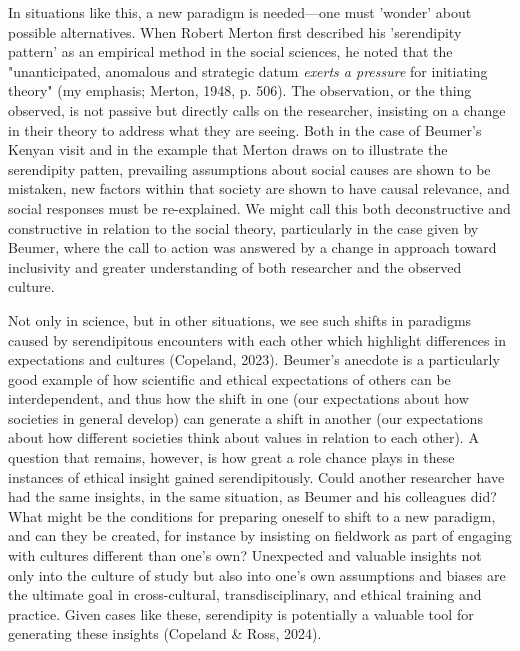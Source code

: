 \documentclass[authordate, commentary]{jote-new-article}
\begin{document}

	In situations like this, a new paradigm is needed—one must 'wonder' about possible alternatives. When Robert Merton first described his 'serendipity pattern' as an empirical method in the social sciences, he noted that the "unanticipated, anomalous and strategic datum \emph{exerts a pressure }for initiating theory" (my emphasis; Merton, 1948, p. 506). The observation, or the thing observed, is not passive but directly calls on the researcher, insisting on a change in their theory to address what they are seeing. Both in the case of Beumer's Kenyan visit and in the example that Merton draws on to illustrate the serendipity patten, prevailing assumptions about social causes are shown to be mistaken, new factors within that society are shown to have causal relevance, and social responses must be re-explained. We might call this both deconstructive and constructive in relation to the social theory, particularly in the case given by Beumer, where the call to action was answered by a change in approach toward inclusivity and greater understanding of both researcher and the observed culture.



	Not only in science, but in other situations, we see such shifts in paradigms caused by serendipitous encounters with each other which highlight differences in expectations and cultures (Copeland, 2023). Beumer's anecdote is a particularly good example of how scientific and ethical expectations of others can be interdependent, and thus how the shift in one (our expectations about how societies in general develop) can generate a shift in another (our expectations about how different societies think about values in relation to each other). A question that remains, however, is how great a role chance plays in these instances of ethical insight gained serendipitously. Could another researcher have had the same insights, in the same situation, as Beumer and his colleagues did? What might be the conditions for preparing oneself to shift to a new paradigm, and can they be created, for instance by insisting on fieldwork as part of engaging with cultures different than one's own? Unexpected and valuable insights not only into the culture of study but also into one's own assumptions and biases are the ultimate goal in cross-cultural, transdisciplinary, and ethical training and practice. Given cases like these, serendipity is potentially a valuable tool for generating these insights (Copeland \& Ross, 2024).
\end{document}
